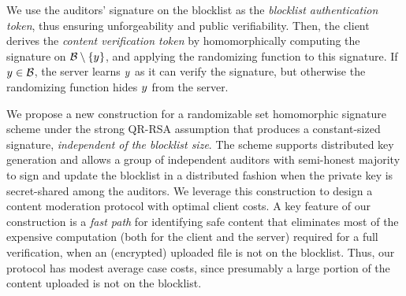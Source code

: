 
We use the auditors' signature on the
blocklist \blocklist as the \emph{blocklist authentication token}, thus ensuring unforgeability and public verifiability. 
Then, the client derives the \emph{content verification token} by homomorphically computing the signature
on $\blocklist \setminus \{\genericCInputElmt\}$, and applying the
randomizing function to this signature. If $\genericCInputElmt \in
\blocklist$, the server learns $\genericCInputElmt$ as it can verify
the signature, but otherwise the randomizing function hides
$\genericCInputElmt$ from the server. 


%
We propose a new construction for a
randomizable set homomorphic signature scheme under the strong QR-RSA assumption that produces a constant-sized signature, \emph{independent 
of the blocklist size}. The scheme supports distributed key generation and allows a group of independent auditors with semi-honest majority to sign and update the blocklist in a distributed fashion when the private key is secret-shared among the auditors. We leverage this construction to design a content moderation protocol with optimal client costs. 
A key feature of our construction is a \emph{fast path} for identifying safe content that eliminates most of the expensive computation (both for the client and the server) required for a full verification, when an (encrypted) uploaded file is not on the blocklist. Thus, our protocol has modest average case costs, since presumably a large portion of the content uploaded is not on the blocklist. 


